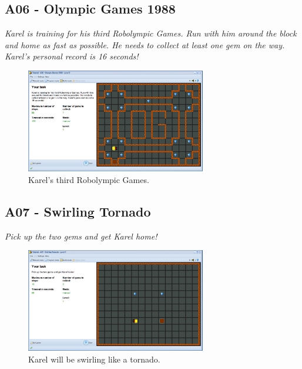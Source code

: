 \documentclass[article,A4,12pt]{llncs}
\begin{document}
\subsection{A06 - Olympic Games 1988 }

{\em Karel is training for his third Robolympic Games. Run with him around the block and home as fast as possible. He needs to collect at least one gem on the way. Karel's personal record is 16 seconds!}

\begin{figure}[!ht]
\begin{center}
\includegraphics[width=0.7\textwidth]{img/a06.png}
\end{center}
\vspace{-4mm}
\caption{Karel's third Robolympic Games.}
\label{fig:a06}
\end{figure}
\noindent


\subsection{A07 - Swirling Tornado}

{\em Pick up the two gems and get Karel home!}

\begin{figure}[!ht]
\begin{center}
\includegraphics[width=0.7\textwidth]{img/a07.png}
\end{center}
\vspace{-4mm}
\caption{Karel will be swirling like a tornado.}
\label{fig:a07}
\vspace{-1cm}
\end{figure}
\noindent
\newpage
\end{document}
